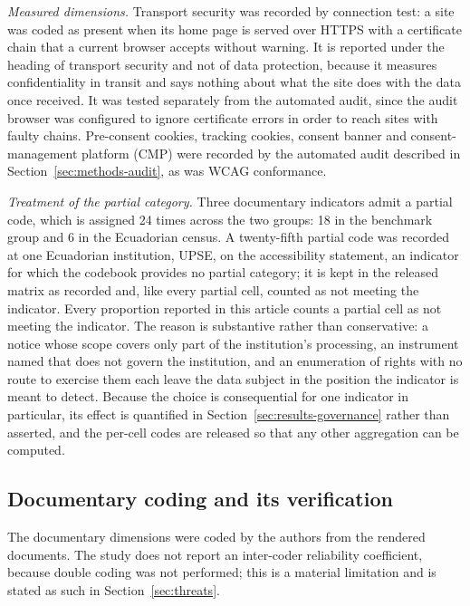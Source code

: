 \documentclass[pdflatex,sn-basic,Numbered,iicol]{sn-jnl}
\theoremstyle{thmstyleone}
\theoremstyle{thmstyletwo}
\theoremstyle{thmstylethree}
\begin{document}
\emph{Measured dimensions.} Transport security was recorded by connection test: a site was coded as present when its home page is served over HTTPS with a certificate chain that a current browser accepts without warning. It is reported under the heading of transport security and not of data protection, because it measures confidentiality in transit and says nothing about what the site does with the data once received. It was tested separately from the automated audit, since the audit browser was configured to ignore certificate errors in order to reach sites with faulty chains. Pre-consent cookies, tracking cookies, consent banner and consent-management platform (CMP) were recorded by the automated audit described in Section~\ref{sec:methods-audit}, as was WCAG conformance.

\emph{Treatment of the partial category.} Three documentary indicators admit a partial code, which is assigned 24 times across the two groups: 18 in the benchmark group and 6 in the Ecuadorian census. A twenty-fifth partial code was recorded at one Ecuadorian institution, UPSE, on the accessibility statement, an indicator for which the codebook provides no partial category; it is kept in the released matrix as recorded and, like every partial cell, counted as not meeting the indicator. Every proportion reported in this article counts a partial cell as not meeting the indicator. The reason is substantive rather than conservative: a notice whose scope covers only part of the institution's processing, an instrument named that does not govern the institution, and an enumeration of rights with no route to exercise them each leave the data subject in the position the indicator is meant to detect. Because the choice is consequential for one indicator in particular, its effect is quantified in Section~\ref{sec:results-governance} rather than asserted, and the per-cell codes are released so that any other aggregation can be computed.

\subsection{Documentary coding and its verification}\label{sec:methods-coding}

The documentary dimensions were coded by the authors from the rendered documents. The study does not report an inter-coder reliability coefficient, because double coding was not performed; this is a material limitation and is stated as such in Section~\ref{sec:threats}.
\end{document}

